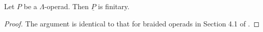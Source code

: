 
\begin{prop}
Let $P$ be a $\Lambda$-operad. Then $\underline{P}$ is finitary.
\end{prop}
\begin{proof}
The argument is identical to that for braided operads in Section 4.1 of \cite{lack-cod}.
\end{proof}

